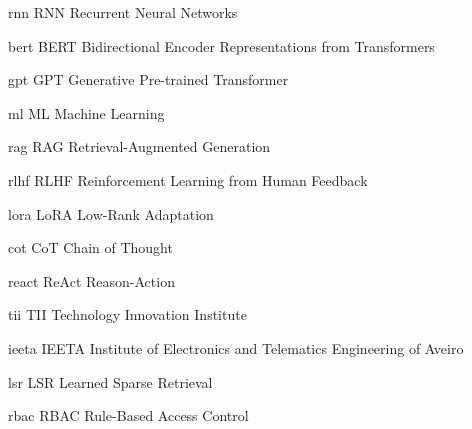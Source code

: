 \newabbreviation
    {rnn}
    {RNN}
    {Recurrent Neural Networks}
\newcommand{\rnn}{\gls{rnn}}

\newabbreviation
    {bert}
    {BERT}
    {Bidirectional Encoder Representations from Transformers}
\newcommand{\bert}{\gls{bert}}

\newabbreviation
    {gpt}
    {GPT}
    {Generative Pre-trained Transformer}
\newcommand{\gpt}{\gls{gpt}}

\newabbreviation
    {ml}
    {ML}
    {Machine Learning}
\newcommand{\mlearning}{\gls{ml}}

\newabbreviation
    {rag}
    {RAG}
    {Retrieval-Augmented Generation}
\newcommand{\rag}{\gls{rag}}

\newabbreviation
    {rlhf}
    {RLHF}
    {Reinforcement Learning from Human Feedback}
\newcommand{\rlhf}{\gls{rlhf}}

\newabbreviation
    {lora}
    {LoRA}
    {Low-Rank Adaptation}
\newcommand{\lora}{\gls{lora}}

\newabbreviation
    {cot}
    {CoT}
    {Chain of Thought}
\newcommand{\chain}{\gls{cot}}

\newabbreviation
    {react}
    {ReAct}
    {Reason-Action}
\newcommand{\react}{\gls{react}}

\newabbreviation
    {tii}
    {TII}
    {Technology Innovation Institute}
\newcommand{\tii}{\gls{tii}}


\newabbreviation
    {ieeta}
    {IEETA}
    {Institute of Electronics and Telematics Engineering of Aveiro}
\newcommand{\ieeta}{\gls{ieeta}}


\newabbreviation
    {lsr}
    {LSR}
    {Learned Sparse Retrieval}
\newcommand{\lsr}{\gls{lsr}}


\newabbreviation
    {rbac}
    {RBAC}
    {Rule-Based Access Control}
\newcommand{\rbac}{\gls{rbac}}
